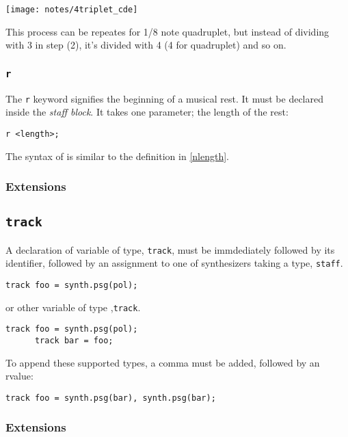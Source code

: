 \begin{center}
\texttt{[image: notes/4triplet\_cde]}
\end{center}

This process can be repeates for 1/8 note quadruplet, but instead of dividing
with 3 in step (2), it's divided with 4 (4 for quadruplet) and so on.


\subsubsection{\texttt{r}}

\np The \verb+r+ keyword signifies the beginning of a musical rest. It must be
declared inside the \textit{staff block}. It takes one parameter; the
length of the rest:

\begin{Verbatim}[frame=single]
      r <length>;
\end{Verbatim}

\np The syntax of  is similar to the definition in 
\autoref{nlength}.

\subsubsection{Extensions}

\subsection{\texttt{track}}
\np A declaration of variable of type,
\verb+track+, must be immdediately followed by its identifier, followed by
an assignment to one of synthesizers taking a type, \verb+staff+. 
\begin{Verbatim}[frame=single]
       track foo = synth.psg(pol);
\end{Verbatim}

or other variable of type ,\verb+track+.
\begin{Verbatim}[frame=single]
      track foo = synth.psg(pol);
      track bar = foo;
\end{Verbatim}

\np To append these supported types, a comma must be added, followed by an rvalue:
\begin{Verbatim}[frame=single]
      track foo = synth.psg(bar), synth.psg(bar);
\end{Verbatim}


\subsubsection{Extensions}

